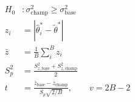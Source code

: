 \begin{align*}
    H_0&: \sigma_\text{champ}^2 \geq \sigma_\text{base}^2 \\
    z_i &= \left|\hat{\theta}_i^* - \tilde{\theta}^*\right|\\[6pt]
    \bar{z} &= \frac{1}{B}\sum_i^B z_i\\[6pt]
    S_p^2 &= \frac{S_{z,\text{base}}^2 + S_{z,\text{champ}}^2}{2}\\[6pt]
    t &= \frac{\bar{z}_\text{base} - \bar{z}_\text{champ}}{S_p\sqrt{2/B}}, \qquad v = 2B - 2
\end{align*}
